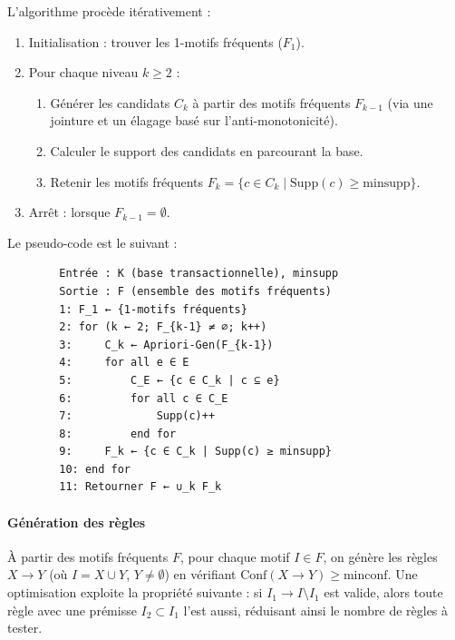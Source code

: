 \documentclass[a4paper,12pt]{article}
\begin{document}
        L’algorithme procède itérativement :
        \begin{enumerate}
            \item Initialisation : trouver les 1-motifs fréquents (\( F_1 \)).
            \item Pour chaque niveau \( k \geq 2 \) :
                \begin{enumerate}
                    \item Générer les candidats \( C_k \) à partir des motifs fréquents \( F_{k-1} \) (via une jointure et un élagage basé sur l’anti-monotonicité).
                    \item Calculer le support des candidats en parcourant la base.
                    \item Retenir les motifs fréquents \( F_k = \{c \in C_k \mid \text{Supp}(c) \geq \text{minsupp}\} \).
                \end{enumerate}
            \item Arrêt : lorsque \( F_{k-1} = \emptyset \).
        \end{enumerate}
        
        Le pseudo-code est le suivant :
        \begin{verbatim}
        Entrée : K (base transactionnelle), minsupp
        Sortie : F (ensemble des motifs fréquents)
        1: F_1 ← {1-motifs fréquents}
        2: for (k ← 2; F_{k-1} ≠ ∅; k++)
        3:     C_k ← Apriori-Gen(F_{k-1})
        4:     for all e ∈ E
        5:         C_E ← {c ∈ C_k | c ⊆ e}
        6:         for all c ∈ C_E
        7:             Supp(c)++
        8:         end for
        9:     F_k ← {c ∈ C_k | Supp(c) ≥ minsupp}
        10: end for
        11: Retourner F ← ∪_k F_k
        \end{verbatim}
        
        \paragraph{Génération des règles}
        
        À partir des motifs fréquents \( F \), pour chaque motif \( I \in F \), on génère les règles \( X \rightarrow Y \) (où \( I = X \cup Y \), \( Y \neq \emptyset \)) en vérifiant \( \text{Conf}(X \rightarrow Y) \geq \text{minconf} \). Une optimisation \cite{AS94} exploite la propriété suivante : si \( I_1 \rightarrow I \setminus I_1 \) est valide, alors toute règle avec une prémisse \( I_2 \subset I_1 \) l’est aussi, réduisant ainsi le nombre de règles à tester.
        
\end{document}
